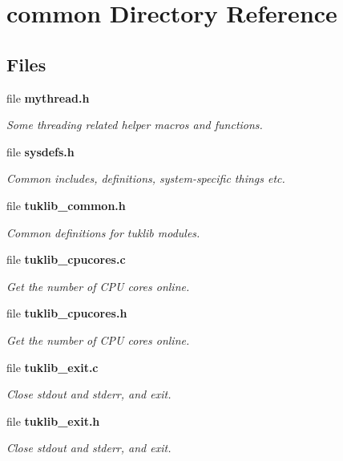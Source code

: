 \section{common Directory Reference}
\label{dir_bdd9a5d540de89e9fe90efdfc6973a4f}
\subsection*{Files}
\begin{DoxyCompactItemize}
\item 
file \textbf{ mythread.\+h}
\begin{DoxyCompactList}\small\item\em Some threading related helper macros and functions. \end{DoxyCompactList}\item 
file \textbf{ sysdefs.\+h}
\begin{DoxyCompactList}\small\item\em Common includes, definitions, system-\/specific things etc. \end{DoxyCompactList}\item 
file \textbf{ tuklib\+\_\+common.\+h}
\begin{DoxyCompactList}\small\item\em Common definitions for tuklib modules. \end{DoxyCompactList}\item 
file \textbf{ tuklib\+\_\+cpucores.\+c}
\begin{DoxyCompactList}\small\item\em Get the number of C\+PU cores online. \end{DoxyCompactList}\item 
file \textbf{ tuklib\+\_\+cpucores.\+h}
\begin{DoxyCompactList}\small\item\em Get the number of C\+PU cores online. \end{DoxyCompactList}\item 
file \textbf{ tuklib\+\_\+exit.\+c}
\begin{DoxyCompactList}\small\item\em Close stdout and stderr, and exit. \end{DoxyCompactList}\item 
file \textbf{ tuklib\+\_\+exit.\+h}
\begin{DoxyCompactList}\small\item\em Close stdout and stderr, and exit. \end{DoxyCompactList}\item 

\end{DoxyCompactItemize}
